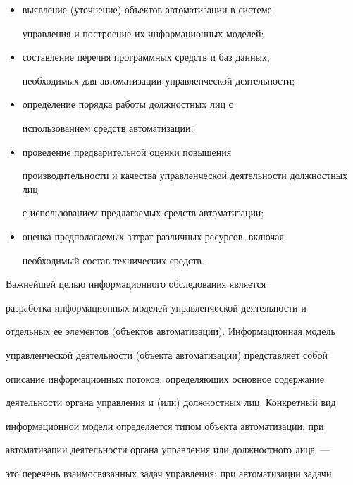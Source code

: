        \begin{itemize}


       \item выявление (уточнение) объектов автоматизации в системе 


управления и построение их информационных моделей;


       \item составление перечня программных средств и баз данных, 


необходимых для автоматизации управленческой деятельности;


       \item определение порядка работы должностных лиц с 


       использованием средств автоматизации;


       \item проведение предварительной оценки повышения 


       производительности и качества управленческой деятельности должностных лиц 


с использованием предлагаемых средств автоматизации;


       \item оценка предполагаемых затрат различных ресурсов, включая 


необходимый состав технических средств.


       \end{itemize}


       


       Важнейшей целью информационного обследования является 


разработка информационных моделей управленческой деятельности и 


отдельных ее элементов (объектов автоматизации). Информационная модель 


управленческой деятельности (объекта автоматизации) представляет собой 


описание информационных потоков, определяющих основное содержание 


деятельности органа управления и (или) должностных лиц. Конкретный вид 


информационной модели определяется типом объекта автоматизации: при 


автоматизации деятельности органа управления или должностного лица~--- 


это перечень взаимосвязанных задач управления; при автоматизации задачи 


